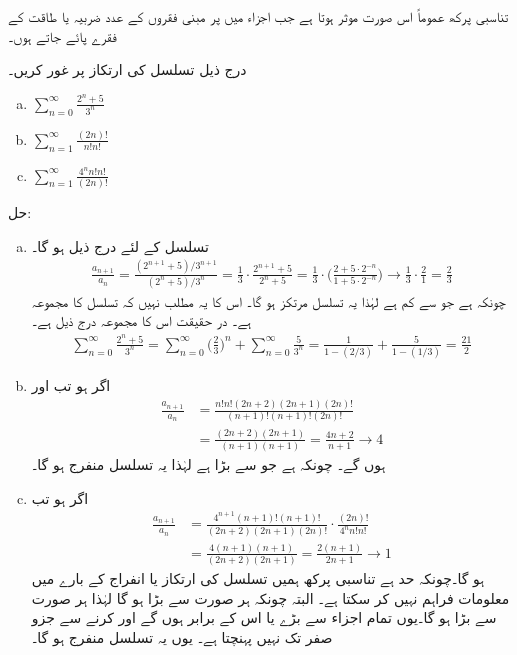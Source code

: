 
تناسبی پرکھ عموماً اس صورت موثر ہوتا ہے جب اجزاء میں  پر مبنی فقروں کے عدد ضربیہ یا  طاقت کے فقرے پائے جاتے ہوں۔

درج ذیل تسلسل کی ارتکاز پر غور کریں۔
\begin{multicols}{3}
\begin{enumerate}[a.]
\item
$\sum\limits_{n=0}^{\infty}\frac{2^n+5}{3^n}$
\item
$\sum\limits_{n=1}^{\infty}\frac{(2n)!}{n!n!}$
\item
$\sum_{n=1}^{\infty}\frac{4^nn!n!}{(2n)!}$
\end{enumerate}
\end{multicols}
حل:\quad
\begin{enumerate}[a.]
\item
تسلسل  کے لئے درج ذیل ہو گا۔
\begin{align*}
\frac{a_{n+1}}{a_n}=\frac{(2^{n+1}+5)/3^{n+1}}{(2^n+5)/3^n}=\frac{1}{3}\cdot\frac{2^{n+1}+5}{2^n+5}=\frac{1}{3}\cdot\big(\frac{2+5\cdot 2^{-n}}{1+5\cdot2^{-n}}\big)\to\frac{1}{3}\cdot\frac{2}{1}=\frac{2}{3}
\end{align*}
چونکہ  ہے جو  سے کم ہے لہٰذا یہ تسلسل مرتکز ہو گا۔ اس کا یہ مطلب نہیں کہ تسلسل کا مجموعہ  ہے۔ در حقیقت اس کا مجموعہ درج ذیل ہے۔
\begin{align*}
\sum_{n=0}^{\infty}\frac{2^n+5}{3^n}=\sum_{n=0}^{\infty}\big(\frac{2}{3}\big)^n+\sum_{n=0}^{\infty}\frac{5}{3^n}=\frac{1}{1-(2/3)}+\frac{5}{1-(1/3)}=\frac{21}{2}
\end{align*}
\item
اگر  ہو تب  اور
\begin{align*}
\frac{a_{n+1}}{a_n}&=\frac{n!n!(2n+2)(2n+1)(2n)!}{(n+1)!(n+1)!(2n)!}\\
&=\frac{(2n+2)(2n+1)}{(n+1)(n+1)}=\frac{4n+2}{n+1}\to 4
\end{align*}
ہوں گے۔ چونکہ   ہے  جو  سے بڑا ہے لہٰذا یہ تسلسل منفرج ہو گا۔
\item
اگر  ہو تب
\begin{align*}
\frac{a_{n+1}}{a_n}&=\frac{4^{n+1}(n+1)!(n+1)!}{(2n+2)(2n+1)(2n)!}\cdot\frac{(2n)!}{4^nn!n!}\\
&=\frac{4(n+1)(n+1)}{(2n+2)(2n+1)}=\frac{2(n+1)}{2n+1}\to 1
\end{align*}
ہو گا۔چونکہ حد  ہے تناسبی پرکھ ہمیں تسلسل کی ارتکاز یا انفراج کے بارے میں معلومات فراہم نہیں کر سکتا ہے۔ البتہ چونکہ  
  ہر صورت  سے بڑا ہو گا لہٰذا  ہر صورت  سے بڑا ہو گا۔یوں تمام اجزاء  سے بڑے یا اس کے برابر ہوں گے اور  کرنے سے  جزو صفر تک نہیں پہنچتا ہے۔ یوں یہ تسلسل منفرج ہو گا۔
\end{enumerate}

